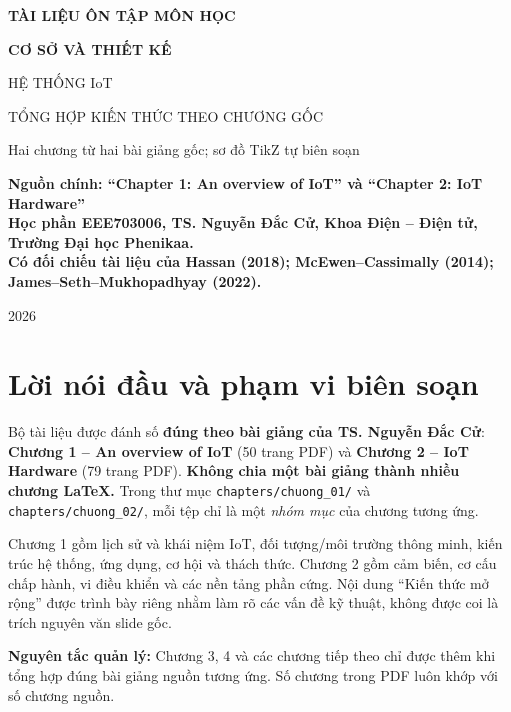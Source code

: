 \documentclass[11pt,oneside]{book}
\begin{document}
\frontmatter
\begin{titlepage}
\centering\vspace*{2.5cm}
{\sffamily\Large\bfseries\color{teal} TÀI LIỆU ÔN TẬP MÔN HỌC\par}\vspace{0.6cm}
{\sffamily\Huge\bfseries\color{navy} CƠ SỞ VÀ THIẾT KẾ\par HỆ THỐNG IoT\par}
\vspace{0.8cm}
{\sffamily\LARGE TỔNG HỢP KIẾN THỨC THEO CHƯƠNG GỐC\par}
\vspace{0.5cm}
{\large Hai chương từ hai bài giảng gốc; sơ đồ TikZ tự biên soạn\par}
\vfill
\begin{tcolorbox}[colback=lightblue,colframe=navy,width=.91\textwidth,arc=2mm]
\centering\large\bfseries Nguồn chính: ``Chapter 1: An overview of IoT'' và ``Chapter 2: IoT Hardware''\\
\normalfont\normalsize Học phần EEE703006, TS. Nguyễn Đắc Cử, Khoa Điện -- Điện tử, Trường Đại học Phenikaa.\\[2mm]
\small Có đối chiếu tài liệu của Hassan (2018); McEwen--Cassimally (2014); James--Seth--Mukhopadhyay (2022).
\end{tcolorbox}
\vfill {\sffamily\large 2026\par}
\end{titlepage}
\chapter*{Lời nói đầu và phạm vi biên soạn}
Bộ tài liệu được đánh số \textbf{đúng theo bài giảng của TS. Nguyễn Đắc Cử}:
\textbf{Chương 1 -- An overview of IoT} (50 trang PDF) và
\textbf{Chương 2 -- IoT Hardware} (79 trang PDF).
\textbf{Không chia một bài giảng thành nhiều chương LaTeX.}
Trong thư mục \texttt{chapters/chuong\_01/} và \texttt{chapters/chuong\_02/},
mỗi tệp chỉ là một \textit{nhóm mục} của chương tương ứng.

Chương 1 gồm lịch sử và khái niệm IoT, đối tượng/môi trường thông minh,
kiến trúc hệ thống, ứng dụng, cơ hội và thách thức.
Chương 2 gồm cảm biến, cơ cấu chấp hành, vi điều khiển và các nền tảng phần cứng.
Nội dung ``Kiến thức mở rộng'' được trình bày riêng nhằm làm rõ các vấn đề
kỹ thuật, không được coi là trích nguyên văn slide gốc.

\begin{notebox}
\textbf{Nguyên tắc quản lý:} Chương 3, 4 và các chương tiếp theo
chỉ được thêm khi tổng hợp đúng bài giảng nguồn tương ứng.
Số chương trong PDF luôn khớp với số chương nguồn.
\end{notebox}
\tableofcontents
\mainmatter


\backmatter
\end{document}
